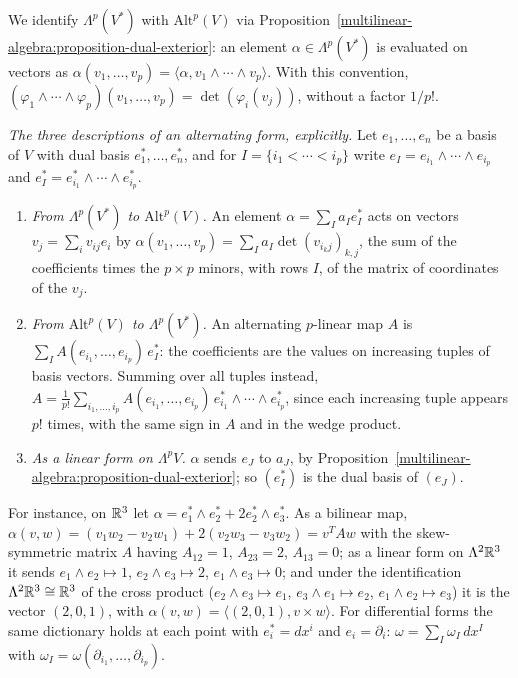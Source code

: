 \begin{notation}\label{multilinear-algebra:notation-forms}
We identify $\Lambda^p(V^*)$ with $\mathrm{Alt}^p(V)$ via
Proposition~\ref{multilinear-algebra:proposition-dual-exterior}: an element $\alpha \in \Lambda^p(V^*)$ is evaluated
on vectors as $\alpha(v_1, \ldots, v_p) = \langle \alpha, v_1 \wedge \cdots \wedge v_p \rangle$. With this convention,
$(\varphi_1 \wedge \cdots \wedge \varphi_p)(v_1, \ldots, v_p) = \det(\varphi_i(v_j))$, without a factor $1/p!$.
\end{notation}

\begin{example}\label{multilinear-algebra:example-forms-dictionary}
\emph{The three descriptions of an alternating form, explicitly.} Let $e_1, \ldots, e_n$ be a basis of $V$ with dual basis $e_1^*, \ldots, e_n^*$, and for $I = \{i_1 < \cdots < i_p\}$ write
$e_I = e_{i_1} \wedge \cdots \wedge e_{i_p}$ and $e_I^* = e_{i_1}^* \wedge \cdots \wedge e_{i_p}^*$.
\begin{enumerate}
\item \emph{From $\Lambda^p(V^*)$ to $\mathrm{Alt}^p(V)$.} An element $\alpha = \sum_Ia_Ie_I^*$ acts on vectors $v_j = \sum_iv_{ij}e_i$ by
$\alpha(v_1, \ldots, v_p) = \sum_Ia_I\det(v_{i_kj})_{k,j}$, the sum of the coefficients times the $p \times p$ minors, with rows $I$, of the matrix of coordinates of the $v_j$.
\item \emph{From $\mathrm{Alt}^p(V)$ to $\Lambda^p(V^*)$.} An alternating $p$-linear map $A$ is $\sum_IA(e_{i_1}, \ldots, e_{i_p})\,e_I^*$: the coefficients are the values on increasing tuples of basis vectors.
Summing over all tuples instead, $A = \frac1{p!}\sum_{i_1, \ldots, i_p}A(e_{i_1}, \ldots, e_{i_p})\,e_{i_1}^* \wedge \cdots \wedge e_{i_p}^*$, since each increasing tuple appears $p!$ times, with the same
sign in $A$ and in the wedge product.
\item \emph{As a linear form on $\Lambda^pV$.} $\alpha$ sends $e_J$ to $a_J$, by Proposition~\ref{multilinear-algebra:proposition-dual-exterior}; so $(e_I^*)$ is the dual basis of $(e_J)$.
\end{enumerate}
For instance, on $\mathbb{R}^3$ let $\alpha = e_1^* \wedge e_2^* + 2e_2^* \wedge e_3^*$. As a bilinear map, $\alpha(v, w) = (v_1w_2 - v_2w_1) + 2(v_2w_3 - v_3w_2) = v^TAw$ with the skew-symmetric matrix $A$ having
$A_{12} = 1$, $A_{23} = 2$, $A_{13} = 0$; as a linear form on $\Lambda^2\mathbb{R}^3$ it sends $e_1 \wedge e_2 \mapsto 1$, $e_2 \wedge e_3 \mapsto 2$, $e_1 \wedge e_3 \mapsto 0$; and under the identification
$\Lambda^2\mathbb{R}^3 \cong \mathbb{R}^3$ of the cross product ($e_2 \wedge e_3 \mapsto e_1$, $e_3 \wedge e_1 \mapsto e_2$, $e_1 \wedge e_2 \mapsto e_3$) it is the vector $(2, 0, 1)$, with
$\alpha(v, w) = \langle(2, 0, 1), v \times w\rangle$. For differential forms the same dictionary holds at each point with $e_i^* = dx^i$ and $e_i = \partial_i$: $\omega = \sum_I\omega_I\,dx^I$ with
$\omega_I = \omega(\partial_{i_1}, \ldots, \partial_{i_p})$.


\end{example}
